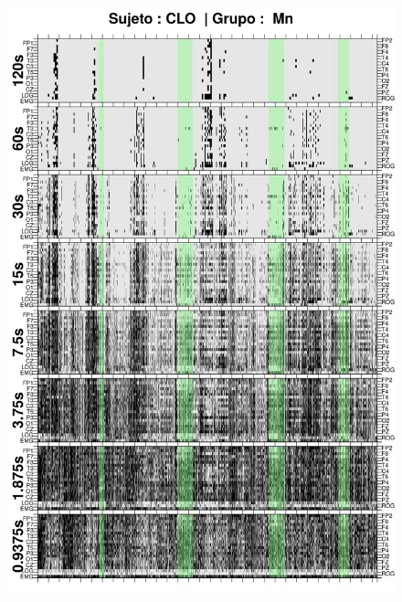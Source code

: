 
\begin{figure}
\centering
\includegraphics[width=0.9\linewidth]
{./img_ejemplos/CLMN10SUE_comp_est_.png} 
\end{figure}

